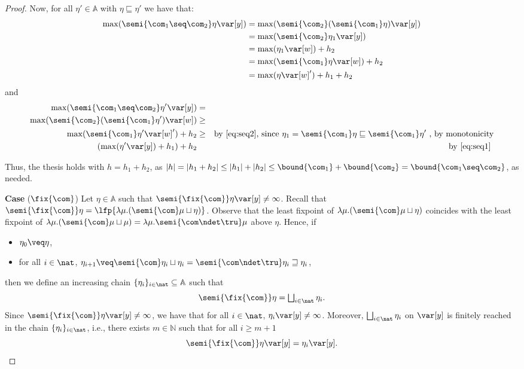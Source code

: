 \begin{proof}
  Now, for all \(\eta' \in \mathbb{A}\) with \(\eta \sqsubseteq \eta'\) we have that:
  \begin{align*}
    \max(\semi{\com_1 \seq \com_2}\eta \var[y])
    &= \max(\semi{\com_2}(\semi{\com_1}\eta) \var[y])\\
    & = \max(\semi{\com_2}\eta_1 \var[y])\\
    & = \max(\eta_1 \var[w]) + h_2\\
    & = \max(\semi{\com_1}\eta \var[w]) + h_2\\
    &= \max(\eta \var[w]')+h_1 + h_2
  \end{align*}
  and
  \begin{align*}
    \max(\semi{\com_1 \seq \com_2}\eta' \var[y]) & = & \\ 
    \max(\semi{\com_2}(\semi{\com_1}\eta') \var[w]) & \geq & \\ 
    \max(\semi{\com_1}\eta' \var[w]') + h_2 & \geq & 
    \text{by \eqref{eq:seq2}, since } \eta_1 = \semi{\com_1}\eta \sqsubseteq \semi{\com_1}\eta' \text{ , by monotonicity} \\
    (\max(\eta' \var[y]) +h_1) + h_2 & & \text{by \eqref{eq:seq1}}\
  \end{align*}

  Thus, the thesis holds with \(h= h_1+h_2\), as
  \(|h| =|h_1 +h_2| \leq |h_1| + |h_2| \leq \bound{\com_1} +
  \bound{\com_2} = \bound{\com_1 \seq \com_2}\), as needed.

  
  \medskip
  
  \noindent
  \textbf{Case} (\(\fix{\com}\)) 
  Let \(\eta \in \mathbb{A}\) such that
  \(\semi{\fix{\com}} \eta \var[y] \neq \infty\). Recall that
  \(\semi{\fix{\com}} \eta = \lfp{\lambda \mu. (\semi{\com}
    \mu \sqcup\eta)}\). Observe that the least fixpoint of
  \(\lambda \mu. (\semi{\com}
  \mu \sqcup\eta)\) coincides with the least
  fixpoint of
  \(\lambda \mu. (\semi{\com} \mu  \sqcup \mu) = \lambda \mu. \semi{ \com\ndet \tru} \mu\) above \(\eta\). Hence, if
  \begin{itemize}
  \item \(\eta_0 \veq \eta\),
  \item for all \(i\in \nat\),
    \(\eta_{i+1} \veq \semi{\com} \eta_i \sqcup \eta_i= \semi{\com \ndet
    \tru} \eta_i \sqsupseteq \eta_i\),
  \end{itemize}
  then we define an increasing chain \(\{\eta_i\}_{i\in \nat}\subseteq \mathbb{A}\) such that
  \[ 
  \semi{\fix{\com}} \eta = \textstyle\bigsqcup_{i \in \nat} \eta_i.
  \]
  Since \(\semi{\fix{\com}} \eta \var[y] \neq \infty\), we have that
  for all \(i\in \nat\), \(\eta_i \var[y] \neq \infty\). Moreover,
  \(\textstyle\bigsqcup_{i \in \nat} \eta_i\) on \(\var[y]\) is
  finitely reached in the chain \(\{\eta_i\}_{i\in \nat}\), i.e.,
  there exists \(m \in \mathbb{N}\) such that for all \(i \geq m+1\)
  \[
  \semi{\fix{\com}} \eta \var[y] = \eta_{i} \var[y].
  \]


\end{proof}

